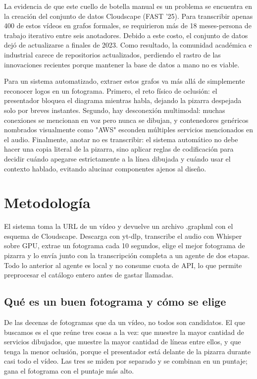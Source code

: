 \documentclass[a4paper, twocolumn, 10pt]{IEEEtran}
\begin{document}
La evidencia de que este cuello de botella manual es un problema se encuentra en la creación del conjunto de datos Cloudscape (FAST '25). Para transcribir apenas 400 de estos vídeos en grafos formales, se requirieron más de 18 meses-persona de trabajo iterativo entre seis anotadores. Debido a este costo, el conjunto de datos dejó de actualizarse a finales de 2023. Como resultado, la comunidad académica e industrial carece de repositorios actualizados, perdiendo el rastro de las innovaciones recientes porque mantener la base de datos a mano no es viable.
 
Para un sistema automatizado, extraer estos grafos va más allá de simplemente reconocer logos en un fotograma. Primero, el reto físico de oclusión: el presentador bloquea el diagrama mientras habla, dejando la pizarra despejada solo por breves instantes. Segundo, hay desconexión multimodal: muchas conexiones se mencionan en voz pero nunca se dibujan, y contenedores genéricos nombrados visualmente como "AWS" esconden múltiples servicios mencionados en el audio. Finalmente, anotar no es transcribir: el sistema automático no debe hacer una copia literal de la pizarra, sino aplicar reglas de codificación para decidir cuándo apegarse estrictamente a la línea dibujada y cuándo usar el contexto hablado, evitando alucinar componentes ajenos al diseño.
 
\section{Metodología}
 
El sistema toma la URL de un vídeo y devuelve un archivo .graphml con el esquema de Cloudscape. Descarga con yt-dlp, transcribe el audio con Whisper sobre GPU, extrae un fotograma cada 10 segundos, elige el mejor fotograma de pizarra y lo envía junto con la transcripción completa a un agente de dos etapas. Todo lo anterior al agente es local y no consume cuota de API, lo que permite preprocesar el catálogo entero antes de gastar llamadas. 
 
\subsection{Qué es un buen fotograma y cómo se elige}
 
De las decenas de fotogramas que da un vídeo, no todos son candidatos. El que buscamos es el que reúne tres cosas a la vez: que muestre la mayor cantidad de servicios dibujados, que muestre la mayor cantidad de líneas entre ellos, y que tenga la menor oclusión, porque el presentador está delante de la pizarra durante casi todo el vídeo. Las tres se miden por separado y se combinan en un puntaje; gana el fotograma con el puntaje más alto. 
 
\end{document}
